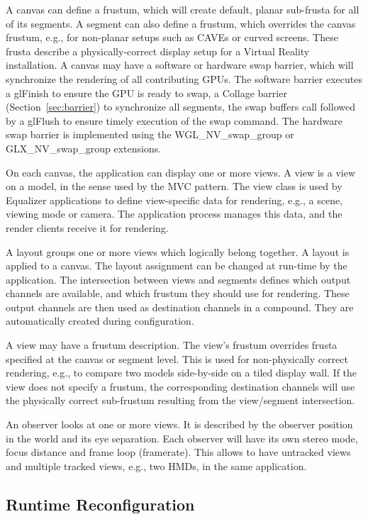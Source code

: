 \documentclass[10pt,journal,compsoc]{IEEEtran}
\newcommand{\sref}[1]{Section~\ref{#1}}
\begin{document}
A canvas can define a frustum, which will create default, planar sub-frusta for
all of its segments. A segment can also define a frustum, which overrides the
canvas frustum, e.g., for non-planar setups such as CAVEs or curved
screens. These frusta describe a physically-correct display setup for a Virtual
Reality installation. \label{sec:swap} A canvas may have a software or hardware
swap barrier, which will synchronize the rendering of all contributing GPUs. The
software barrier executes a \textsf{glFinish} to ensure the GPU is ready to
swap, a Collage barrier (\sref{sec:barrier}) to synchronize all segments, the
swap buffers call followed by a \textsf{glFlush} to ensure timely execution of
the swap command. The hardware swap barrier is implemented using the
\textsf{WGL\_NV\_swap\_group} or \textsf{GLX\_NV\_swap\_group} extensions.

On each canvas, the application can display one or more views. A view is a view
on a model, in the sense used by the MVC pattern. The view class is used by
Equalizer applications to define view-specific data for rendering, e.g., a
scene, viewing mode or camera. The application process manages this data, and
the render clients receive it for rendering.

A layout groups one or more views which logically belong together. A layout is
applied to a canvas. The layout assignment can be changed at run-time by the
application. The intersection between views and segments defines which output
channels are available, and which frustum they should use for rendering. These
output channels are then used as destination channels in a compound. They are
automatically created during configuration.

A view may have a frustum description. The view's frustum overrides frusta
specified at the canvas or segment level. This is used for non-physically
correct rendering, e.g., to compare two models side-by-side on a tiled display
wall. If the view does not specify a frustum, the corresponding destination
channels will use the physically correct sub-frustum resulting from the
view/segment intersection.

\label{sec:observer}
An observer looks at one or more views. It is described by the observer position
in the world and its eye separation. Each observer will have its own stereo
mode, focus distance and frame loop (framerate). This allows to have untracked
views and multiple tracked views, e.g., two HMDs, in the same application.

\subsection{Runtime Reconfiguration}\label{sec:reconfig}
\end{document}
